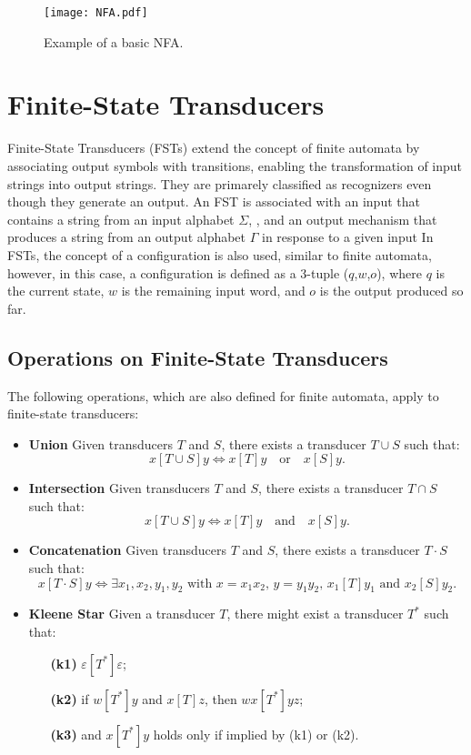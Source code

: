 \begin{figure}[H]
    \centering
    \texttt{[image: NFA.pdf]}
    \caption{Example of a basic NFA.}
    \label{fig:1}
\end{figure}


\section{Finite-State Transducers}

Finite-State Transducers (FSTs) extend the concept of finite automata by associating output symbols with transitions, 
enabling the transformation of input strings into output strings. They are primarely classified as recognizers even though they generate an output.
An FST is associated with an input that contains a string from an input alphabet $\Sigma$,
, and an output mechanism that produces a string from an output alphabet $\Gamma$ in response to a given input
In FSTs, the concept of a configuration is also used, similar to finite automata, however, in this case, 
a configuration is defined as a 3-tuple (\(q\),\(w\),\(o\)), where \(q\) is the current state, \(w\) is the remaining input word, and \(o\) is the output produced so far.

\subsection{Operations on Finite-State Transducers}

The following operations, which are also defined for finite automata, apply to finite-state transducers:\cite{finite_state_transducer}

\begin{itemize}
    \item \textbf{Union} Given transducers $T$ and $S$, there exists a transducer $T \cup S$ such that:
    \[
    x[T \cup S]y \iff x[T]y \quad \text{or} \quad x[S]y.
    \]

    \item \textbf{Intersection} Given transducers $T$ and $S$, there exists a transducer $T \cap S$ such that:
    \[
    x[T \cup S]y \iff x[T]y \quad \text{and} \quad x[S]y.
    \]

    \item \textbf{Concatenation} Given transducers $T$ and $S$, there exists a transducer $T \cdot S$ such that:
    \[
    x[T \cdot S]y \iff \exists x_1, x_2, y_1, y_2 \text{ with } x = x_1 x_2,\, y = y_1 y_2,\, x_1[T]y_1 \text{ and } x_2[S]y_2.
    \]

    \item \textbf{Kleene Star} Given a transducer $T$, there might exist a transducer $T^*$ such that:
    \begin{itemize}
        \item[\textbf{(k1)}] $\varepsilon[T^*]\varepsilon$;
        \item[\textbf{(k2)}] if $w[T^*]y$ and $x[T]z$, then $wx[T^*]yz$;
        \item[\textbf{(k3)}] and $x[T^*]y$ holds only if implied by (k1) or (k2).
    \end{itemize}

\end{itemize}

